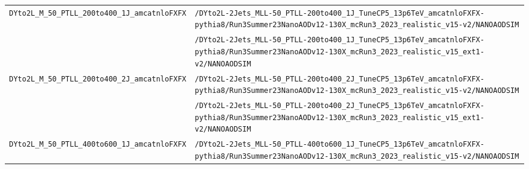 \begin{longtable}{@{}>{\RaggedRight\arraybackslash}p{} >{\RaggedRight\arraybackslash}p{}@{}}
\addlinespace[2pt]
\texttt{DYto2L\_\allowbreak{}M\_\allowbreak{}50\_\allowbreak{}PTLL\_\allowbreak{}200to400\_\allowbreak{}1J\_\allowbreak{}amcatnloFXFX} & \texttt{/\allowbreak{}DYto2L-\allowbreak{}2Jets\_\allowbreak{}MLL-\allowbreak{}50\_\allowbreak{}PTLL-\allowbreak{}200to400\_\allowbreak{}1J\_\allowbreak{}TuneCP5\_\allowbreak{}13p6TeV\_\allowbreak{}amcatnloFXFX-\allowbreak{}pythia8/\allowbreak{}Run3Summer23NanoAODv12-\allowbreak{}130X\_\allowbreak{}mcRun3\_\allowbreak{}2023\_\allowbreak{}realistic\_\allowbreak{}v15-\allowbreak{}v2/\allowbreak{}NANOAODSIM} \\
 & \texttt{/\allowbreak{}DYto2L-\allowbreak{}2Jets\_\allowbreak{}MLL-\allowbreak{}50\_\allowbreak{}PTLL-\allowbreak{}200to400\_\allowbreak{}1J\_\allowbreak{}TuneCP5\_\allowbreak{}13p6TeV\_\allowbreak{}amcatnloFXFX-\allowbreak{}pythia8/\allowbreak{}Run3Summer23NanoAODv12-\allowbreak{}130X\_\allowbreak{}mcRun3\_\allowbreak{}2023\_\allowbreak{}realistic\_\allowbreak{}v15\_\allowbreak{}ext1-\allowbreak{}v2/\allowbreak{}NANOAODSIM} \\
\addlinespace[2pt]
\texttt{DYto2L\_\allowbreak{}M\_\allowbreak{}50\_\allowbreak{}PTLL\_\allowbreak{}200to400\_\allowbreak{}2J\_\allowbreak{}amcatnloFXFX} & \texttt{/\allowbreak{}DYto2L-\allowbreak{}2Jets\_\allowbreak{}MLL-\allowbreak{}50\_\allowbreak{}PTLL-\allowbreak{}200to400\_\allowbreak{}2J\_\allowbreak{}TuneCP5\_\allowbreak{}13p6TeV\_\allowbreak{}amcatnloFXFX-\allowbreak{}pythia8/\allowbreak{}Run3Summer23NanoAODv12-\allowbreak{}130X\_\allowbreak{}mcRun3\_\allowbreak{}2023\_\allowbreak{}realistic\_\allowbreak{}v15-\allowbreak{}v2/\allowbreak{}NANOAODSIM} \\
 & \texttt{/\allowbreak{}DYto2L-\allowbreak{}2Jets\_\allowbreak{}MLL-\allowbreak{}50\_\allowbreak{}PTLL-\allowbreak{}200to400\_\allowbreak{}2J\_\allowbreak{}TuneCP5\_\allowbreak{}13p6TeV\_\allowbreak{}amcatnloFXFX-\allowbreak{}pythia8/\allowbreak{}Run3Summer23NanoAODv12-\allowbreak{}130X\_\allowbreak{}mcRun3\_\allowbreak{}2023\_\allowbreak{}realistic\_\allowbreak{}v15\_\allowbreak{}ext1-\allowbreak{}v2/\allowbreak{}NANOAODSIM} \\
\addlinespace[2pt]
\texttt{DYto2L\_\allowbreak{}M\_\allowbreak{}50\_\allowbreak{}PTLL\_\allowbreak{}400to600\_\allowbreak{}1J\_\allowbreak{}amcatnloFXFX} & \texttt{/\allowbreak{}DYto2L-\allowbreak{}2Jets\_\allowbreak{}MLL-\allowbreak{}50\_\allowbreak{}PTLL-\allowbreak{}400to600\_\allowbreak{}1J\_\allowbreak{}TuneCP5\_\allowbreak{}13p6TeV\_\allowbreak{}amcatnloFXFX-\allowbreak{}pythia8/\allowbreak{}Run3Summer23NanoAODv12-\allowbreak{}130X\_\allowbreak{}mcRun3\_\allowbreak{}2023\_\allowbreak{}realistic\_\allowbreak{}v15-\allowbreak{}v2/\allowbreak{}NANOAODSIM} \\

\end{longtable}
